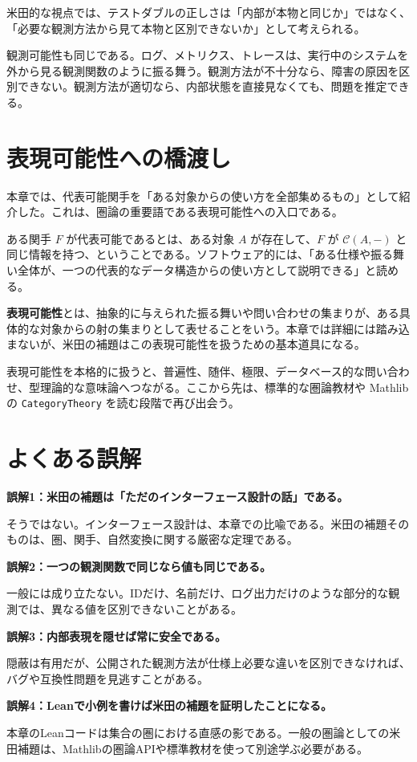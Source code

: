 \begin{intuitionbox}
米田的な視点では、テストダブルの正しさは「内部が本物と同じか」ではなく、「必要な観測方法から見て本物と区別できないか」として考えられる。
\end{intuitionbox}

観測可能性も同じである。ログ、メトリクス、トレースは、実行中のシステムを外から見る観測関数のように振る舞う。観測方法が不十分なら、障害の原因を区別できない。観測方法が適切なら、内部状態を直接見なくても、問題を推定できる。

\section{表現可能性への橋渡し}

本章では、代表可能関手を「ある対象からの使い方を全部集めるもの」として紹介した。これは、圏論の重要語である表現可能性への入口である。

ある関手 \(F\) が代表可能であるとは、ある対象 \(A\) が存在して、\(F\) が \(\mathcal{C}(A,-)\) と同じ情報を持つ、ということである。ソフトウェア的には、「ある仕様や振る舞い全体が、一つの代表的なデータ構造からの使い方として説明できる」と読める。

\begin{definitionbox}
\textbf{表現可能性}とは、抽象的に与えられた振る舞いや問い合わせの集まりが、ある具体的な対象からの射の集まりとして表せることをいう。本章では詳細には踏み込まないが、米田の補題はこの表現可能性を扱うための基本道具になる。
\end{definitionbox}

表現可能性を本格的に扱うと、普遍性、随伴、極限、データベース的な問い合わせ、型理論的な意味論へつながる。ここから先は、標準的な圏論教材や Mathlib の \texttt{CategoryTheory} を読む段階で再び出会う。

\section{よくある誤解}

\begin{warningbox}
\textbf{誤解1：米田の補題は「ただのインターフェース設計の話」である。}

そうではない。インターフェース設計は、本章での比喩である。米田の補題そのものは、圏、関手、自然変換に関する厳密な定理である。

\medskip
\textbf{誤解2：一つの観測関数で同じなら値も同じである。}

一般には成り立たない。IDだけ、名前だけ、ログ出力だけのような部分的な観測では、異なる値を区別できないことがある。

\medskip
\textbf{誤解3：内部表現を隠せば常に安全である。}

隠蔽は有用だが、公開された観測方法が仕様上必要な違いを区別できなければ、バグや互換性問題を見逃すことがある。

\medskip
\textbf{誤解4：Leanで小例を書けば米田の補題を証明したことになる。}

本章のLeanコードは集合の圏における直感の影である。一般の圏論としての米田補題は、Mathlibの圏論APIや標準教材を使って別途学ぶ必要がある。
\end{warningbox}

